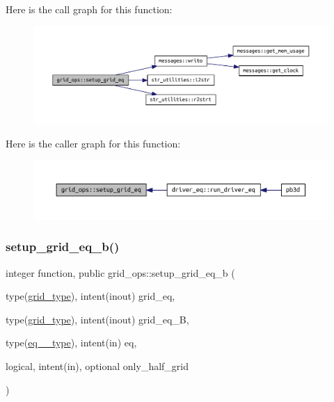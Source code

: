 Here is the call graph for this function\+:\nopagebreak
\begin{figure}[H]
\begin{center}
\leavevmode
\includegraphics[width=350pt]{namespacegrid__ops_af63366847d1caa64a7d329672292fd34_cgraph}
\end{center}
\end{figure}
Here is the caller graph for this function\+:\nopagebreak
\begin{figure}[H]
\begin{center}
\leavevmode
\includegraphics[width=350pt]{namespacegrid__ops_af63366847d1caa64a7d329672292fd34_icgraph}
\end{center}
\end{figure}
\mbox{\label{namespacegrid__ops_ad16495ddd320562451c2325bafecf2d8}} 
\subsubsection{\texorpdfstring{setup\+\_\+grid\+\_\+eq\+\_\+b()}{setup\_grid\_eq\_b()}}
{\footnotesize\ttfamily integer function, public grid\+\_\+ops\+::setup\+\_\+grid\+\_\+eq\+\_\+b (\begin{DoxyParamCaption}\item[{type(\hyperlink{structgrid__vars_1_1grid__type}{grid\+\_\+type}), intent(inout)}]{grid\+\_\+eq,  }\item[{type(\hyperlink{structgrid__vars_1_1grid__type}{grid\+\_\+type}), intent(inout)}]{grid\+\_\+eq\+\_\+B,  }\item[{type(\hyperlink{structeq__vars_1_1eq__1__type}{eq\+\_\+1\+\_\+type}), intent(in)}]{eq,  }\item[{logical, intent(in), optional}]{only\+\_\+half\+\_\+grid }\end{DoxyParamCaption})}



